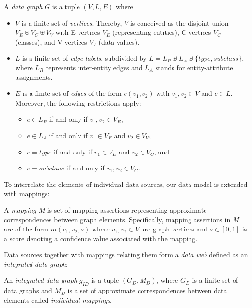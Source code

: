 \begin{definition}\label{def:datagraph}
A \emph{data graph} $G$ is a tuple $(V,L,E)$ where
\begin{itemize}
  \item $V$ is a finite set of \emph{vertices}. Thereby, $V$ is
  conceived as the disjoint union $V_E\uplus
  V_C\uplus V_V$ with E-vertices $V_E$
  (representing entities), C-vertices $V_C$
  (classes), and V-vertices $V_V$ (data values).
  \item $L$ is a finite set of \emph{edge
  labels}, subdivided by $L = L_R \uplus L_A \uplus
  \{type, subclass\}$, where $L_R$ represents
  inter-entity edges and $L_A$ stands for
  entity-attribute assignments. \item $E$ is a
  finite set of \emph{edges} of the form
  $e(v_1,v_2)$ with $v_1,v_2\in V$ and $e\in L$.
  Moreover, the following restrictions apply:
  \begin{itemize}
    \item $e \in L_R$ if and only if $v_1, v_2 \in V_E$,
    \item $e \in L_A$ if and only if $v_1 \in V_E$ and $v_2 \in V_V$,
    \item $e = \mathit{type}$ if and only if $v_1 \in V_E$ and $v_2 \in V_C$, and
    \item $e = \mathit{subclass}$ if and only if $v_1, v_2 \in V_C$.
  \end{itemize}
\end{itemize}
\end{definition}

To interrelate the elements of individual data sources, our data
model is extended with mappings:

\begin{definition} A \emph{mapping} $M$ is set of mapping assertions representing approximate
correspondences between graph elements. Specifically, mapping assertions in $M$ are of the form
$m(v_1,v_2, s)$ where $v_1,v_2 \in V$ are graph vertices  and $s \in [0,1]$ is a score denoting a
confidence value associated with the mapping.
\end{definition}

Data sources together with mappings relating them form a \emph{data web} defined as an {\em integrated data graph}:

\begin{definition} An \emph{integrated data graph} $g_{ID}$ is a tuple $(G_D,M_D)$, where $G_D$ is a
finite set of data graphs and $M_D$ is a set of approximate correspondences between data elements
called \emph{individual mappings}.
\end{definition}

